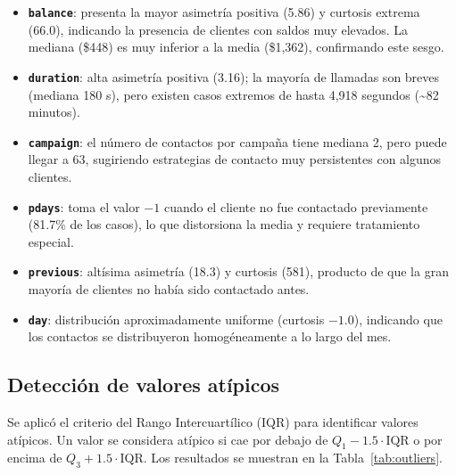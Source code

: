 \documentclass[conference]{IEEEtran}
\begin{document}
\begin{itemize}
    \item \textbf{\texttt{balance}}: presenta la mayor asimetría positiva (5.86) y curtosis extrema (66.0), indicando la presencia de clientes con saldos muy elevados. La mediana (\$448) es muy inferior a la media (\$1{,}362), confirmando este sesgo.
    \item \textbf{\texttt{duration}}: alta asimetría positiva (3.16); la mayoría de llamadas son breves (mediana 180 s), pero existen casos extremos de hasta 4{,}918 segundos (\textasciitilde{}82 minutos).
    \item \textbf{\texttt{campaign}}: el número de contactos por campaña tiene mediana 2, pero puede llegar a 63, sugiriendo estrategias de contacto muy persistentes con algunos clientes.
    \item \textbf{\texttt{pdays}}: toma el valor $-1$ cuando el cliente no fue contactado previamente (81.7\% de los casos), lo que distorsiona la media y requiere tratamiento especial.
    \item \textbf{\texttt{previous}}: altísima asimetría (18.3) y curtosis (581), producto de que la gran mayoría de clientes no había sido contactado antes.
    \item \textbf{\texttt{day}}: distribución aproximadamente uniforme (curtosis $-1.0$), indicando que los contactos se distribuyeron homogéneamente a lo largo del mes.
\end{itemize}

\subsection{Detección de valores atípicos}

Se aplicó el criterio del Rango Intercuartílico (IQR) para identificar valores atípicos. Un valor se considera atípico si cae por debajo de $Q_1 - 1.5 \cdot \text{IQR}$ o por encima de $Q_3 + 1.5 \cdot \text{IQR}$. Los resultados se muestran en la Tabla~\ref{tab:outliers}.
\end{document}
